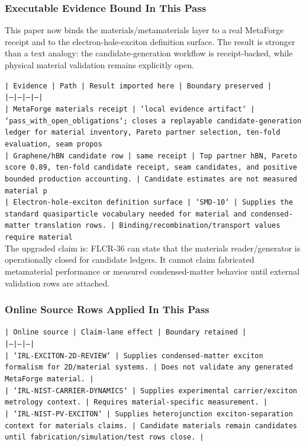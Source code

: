 \documentclass[11pt]{article}
\begin{document}
\subsubsection*{Executable Evidence Bound In This Pass}

This paper now binds the materials/metamaterials layer to a real MetaForge receipt and to the electron-hole-exciton definition surface. The result is stronger than a text analogy: the candidate-generation workflow is receipt-backed, while physical material validation remains explicitly open.

\noindent\texttt{| Evidence | Path | Result imported here | Boundary preserved |}\\
\noindent\texttt{|---|---|---|---|}\\
\noindent\texttt{| MetaForge materials receipt | `local evidence artifact` | `pass\_with\_open\_obligations`; closes a replayable candidate-generation ledger for material inventory, Pareto partner selection, ten-fold evaluation, seam propos}\\
\noindent\texttt{| Graphene/hBN candidate row | same receipt | Top partner hBN, Pareto score 0.89, ten-fold candidate receipt, seam candidates, and positive bounded production accounting. | Candidate estimates are not measured material p}\\
\noindent\texttt{| Electron-hole-exciton definition surface | `SMD-10` | Supplies the standard quasiparticle vocabulary needed for material and condensed-matter translation rows. | Binding/recombination/transport values require material }\\

The upgraded claim is: FLCR-36 can state that the materials reader/generator is operationally closed for candidate ledgers. It cannot claim fabricated metamaterial performance or measured condensed-matter behavior until external validation rows are attached.

\subsubsection*{Online Source Rows Applied In This Pass}

\noindent\texttt{| Online source | Claim-lane effect | Boundary retained |}\\
\noindent\texttt{|---|---|---|}\\
\noindent\texttt{| `IRL-EXCITON-2D-REVIEW` | Supplies condensed-matter exciton formalism for 2D/material systems. | Does not validate any generated MetaForge material. |}\\
\noindent\texttt{| `IRL-NIST-CARRIER-DYNAMICS` | Supplies experimental carrier/exciton metrology context. | Requires material-specific measurement. |}\\
\noindent\texttt{| `IRL-NIST-PV-EXCITON` | Supplies heterojunction exciton-separation context for materials claims. | Candidate materials remain candidates until fabrication/simulation/test rows close. |}\\
\end{document}
